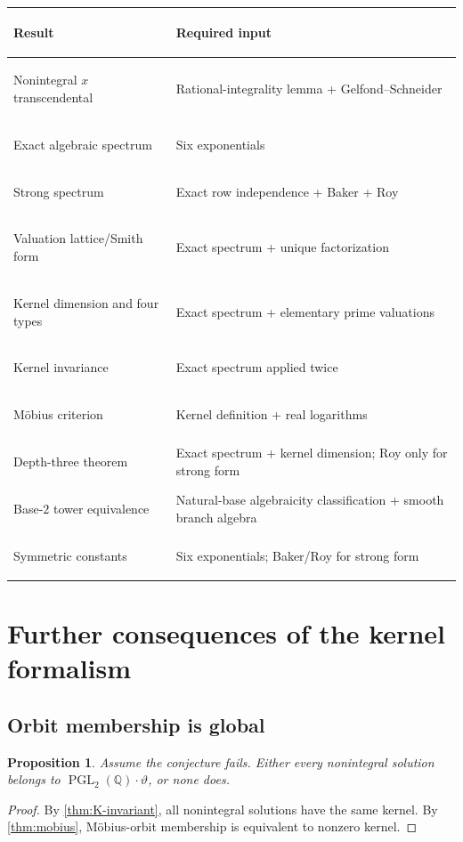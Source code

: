 \documentclass[11pt,oneside]{article}
\newtheorem{proposition}[theorem]{Proposition}
\theoremstyle{definition}
\theoremstyle{remark}
\newcommand{\Q}{\mathbb Q}
\newcommand{\PGL}{\operatorname{PGL}}
\begin{document}
\begin{center}
\begin{tabularx}{0.96\textwidth}{>{\bfseries\raggedright\arraybackslash}p{}>{\raggedright\arraybackslash}X}
\toprule
Result & Required input \\
\midrule
Nonintegral $x$ transcendental & Rational-integrality lemma + Gelfond--Schneider \\
Exact algebraic spectrum & Six exponentials \\
Strong spectrum & Exact row independence + Baker + Roy \\
Valuation lattice/Smith form & Exact spectrum + unique factorization \\
Kernel dimension and four types & Exact spectrum + elementary prime valuations \\
Kernel invariance & Exact spectrum applied twice \\
M\"obius criterion & Kernel definition + real logarithms \\
Depth-three theorem & Exact spectrum + kernel dimension; Roy only for strong form \\
Base-$2$ tower equivalence & Natural-base algebraicity classification + smooth branch algebra \\
Symmetric constants & Six exponentials; Baker/Roy for strong form \\
\bottomrule
\end{tabularx}
\end{center}

\section{Further consequences of the kernel formalism}\label{app:kernel-consequences}

\subsection{Orbit membership is global}

\begin{proposition}
Assume the conjecture fails.  Either every nonintegral solution belongs to
$\PGL_2(\Q)\cdot\vartheta$, or none does.
\end{proposition}

\begin{proof}
By \cref{thm:K-invariant}, all nonintegral solutions have the same kernel.  By
\cref{thm:mobius}, M\"obius-orbit membership is equivalent to nonzero kernel.
\end{proof}
\end{document}

